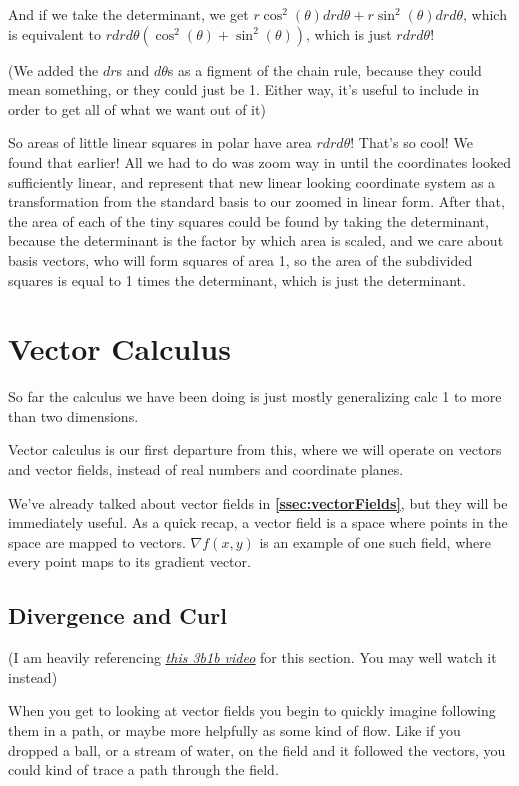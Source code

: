 \documentclass[12pt, letterpaper]{article}
\newcommand{\externalLink}[2]{\emph{\underline{\href{#1}{#2}}}}
\begin{document}
And if we take the determinant, we get $r\cos^2(\theta)dr d\theta + r\sin^2(\theta)drd\theta$, which is equivalent to
$rdrd\theta(\cos^2(\theta) + \sin^2(\theta))$, which is just $rdrd\theta$!

(We added the $dr$s and $d\theta$s as a figment of the chain rule, because they could mean something, or they could just be 1. 
Either way, it's useful to include in order to get all of what we want out of it)

So areas of little linear squares in polar have area $rdrd\theta$!
That's so cool! We found that earlier!
All we had to do was zoom way in until the coordinates looked sufficiently linear,
and represent that new linear looking coordinate system as a transformation from the standard basis to our zoomed in linear form.
After that, the area of each of the tiny squares could be found by taking the determinant, because the determinant is the factor by which area is scaled,
and we care about basis vectors, who will form squares of area 1, so the area of the subdivided squares is equal to 1 times the determinant, which is just the determinant.

\section{Vector Calculus}
So far the calculus we have been doing is just mostly generalizing calc 1 to more than two dimensions.

Vector calculus is our first departure from this, where we will operate on vectors and vector fields, instead of real numbers and coordinate planes.

We've already talked about vector fields in \textbf{\ref{ssec:vectorFields}}, but they will be immediately useful.
As a quick recap, a vector field is a space where points in the space are mapped to vectors.
$\nabla f(x, y)$ is an example of one such field, where every point maps to its gradient vector. 

\subsection{Divergence and Curl}
({I am heavily referencing \externalLink{https://www.youtube.com/watch?v=rB83DpBJQsE}{this 3b1b video} for this section. You may well watch it instead})


When you get to looking at vector fields you begin to quickly imagine following them in a path, or maybe more helpfully as some kind of flow.
Like if you dropped a ball, or a stream of water, on the field and it followed the vectors, you could kind of trace a path through the field.
\end{document}
